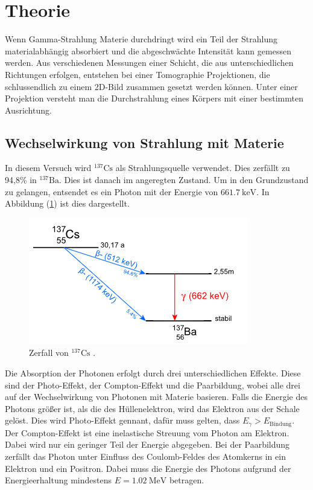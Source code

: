 
\section{Theorie}
\label{sec:Theorie}
Wenn Gamma-Strahlung Materie durchdringt wird ein Teil der Strahlung materialabhängig absorbiert und die abgeschwächte Intensität kann gemessen werden. Aus verschiedenen Messungen einer Schicht, die aus unterschiedlichen Richtungen erfolgen, entstehen bei einer Tomographie Projektionen, die schlussendlich zu einem 2D-Bild zusammen gesetzt werden können. Unter einer Projektion versteht man die Durchstrahlung eines Körpers mit einer bestimmten Ausrichtung. \\
\subsection{Wechselwirkung von Strahlung mit Materie}
In diesem Versuch wird ${}^{137}\mathrm{Cs}$ als Strahlungsquelle verwendet. Dies zerfällt zu 94,8\% in ${}^{137}\mathrm{Ba}$. Dies ist danach im angeregten Zustand. Um in den Grundzustand zu gelangen, entsendet es ein Photon mit der Energie von $\SI{661,7}{\kilo\electronvolt}$. In Abbildung (\ref{fig:caes}) ist dies dargestellt.
\begin{figure}
	\centering
	\includegraphics[scale=0.7]{fig/caes.png}
	\caption{Zerfall von ${}^{137}\mathrm{Cs}$ \cite{leifi}.}
	\label{fig:caes}
\end{figure}
\FloatBarrier
\noindent Die Absorption der Photonen erfolgt durch drei unterschiedlichen Effekte. Diese sind der Photo-Effekt, der Compton-Effekt und die Paarbildung, wobei alle drei auf der Wechselwirkung von Photonen mit Materie basieren.
Falls die Energie des Photons größer ist, als die des Hüllenelektron, wird das Elektron aus der Schale gelöst. Dies wird Photo-Effekt gennant, dafür muss gelten, dass $E_\gamma>E_\mathrm{Bindung}$.
Der Compton-Effekt ist eine inelastische Streuung vom Photon am Elektron. Dabei wird nur ein geringer Teil der Energie abgegeben. Bei der Paarbildung zerfällt das Photon unter Einfluss des Coulomb-Feldes des Atomkerns in ein Elektron und ein Positron. Dabei muss die Energie des Photons aufgrund der Energieerhaltung mindestens $E=\SI{1,02}{\mega\electronvolt}$ betragen.
